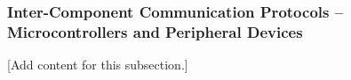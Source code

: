 
\subsubsection{Inter-Component Communication Protocols -- Microcontrollers and Peripheral Devices}
\label{subsubsec:design_2_2_3_intercomponent_protocols_mc_peripherals}

[Add content for this subsection.]
